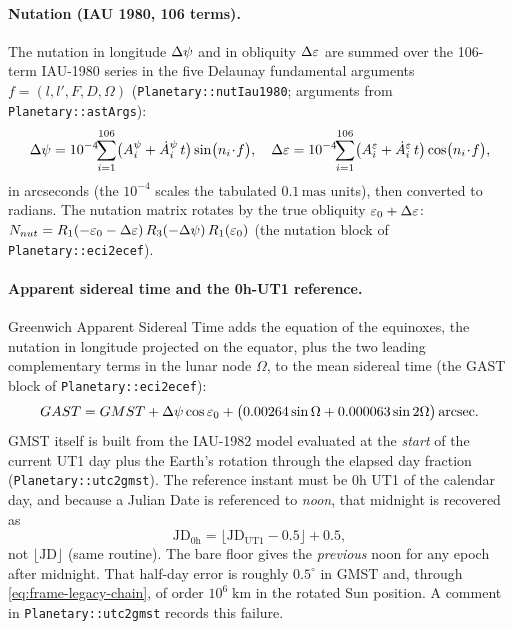 \documentclass[main.tex]{subfiles}
\begin{document}
\paragraph{Nutation (IAU 1980, 106 terms).}
The nutation in longitude $\Delta\psi$ and in obliquity $\Delta\varepsilon$ are summed
over the 106-term IAU-1980 series \cite{iers2010} in the five Delaunay
fundamental arguments $f = (l, l', F, D, \Omega)$
(\texttt{Planetary::nutIau1980}; arguments from
\texttt{Planetary::astArgs}):
\begin{equation}
\dpsi = 10^{-4}\!\!\sum_{i=1}^{106}\!\big(A^{\psi}_i + \dot A^{\psi}_i\,t\big)\sin\!\big(\bm{n}_i\!\cdot\! f\big),
\quad
\deps = 10^{-4}\!\!\sum_{i=1}^{106}\!\big(A^{\varepsilon}_i + \dot A^{\varepsilon}_i\,t\big)\cos\!\big(\bm{n}_i\!\cdot\! f\big),
\label{eq:frame-nutation}
\end{equation}
in arcseconds (the $10^{-4}$ scales the tabulated $0.1\,\mathrm{mas}$
units), then converted to radians.  The nutation matrix rotates by the
true obliquity $\varepsilon_0 + \Delta\varepsilon$:
$N_{nut} = R_{1}(-\varepsilon_0-\Delta\varepsilon)\,R_{3}(-\Delta\psi)\,R_{1}(\varepsilon_0)$
(the nutation block of \texttt{Planetary::eci2ecef}).

\paragraph{Apparent sidereal time and the 0h-UT1 reference.}
Greenwich Apparent Sidereal Time adds the equation of the equinoxes,
the nutation in longitude projected on the equator, plus the two leading
complementary terms in the lunar node $\Omega$, to the mean sidereal
time (the GAST block of \texttt{Planetary::eci2ecef}):
\begin{equation}
GAST = GMST + \Delta\psi\cos\varepsilon_0
        + \big(0.00264\sin\Omega + 0.000063\sin 2\Omega\big)\,\text{arcsec}.
\label{eq:frame-gast}
\end{equation}
GMST itself is built from the IAU-1982 model evaluated at the
\emph{start} of the current UT1 day plus the Earth's rotation through the
elapsed day fraction (\texttt{Planetary::utc2gmst}).  The reference
instant must be 0h UT1 of the calendar day, and because a Julian Date is
referenced to \emph{noon}, that midnight is recovered as
\begin{equation}
\mathrm{JD}_{0\mathrm h} = \big\lfloor \mathrm{JD}_{\mathrm{UT1}} - 0.5\big\rfloor + 0.5,
\label{eq:frame-0h-ut1}
\end{equation}
not $\lfloor\mathrm{JD}\rfloor$ (same routine).  The bare floor gives
the \emph{previous} noon for any epoch after midnight.  That half-day
error is roughly $0.5^{\circ}$ in GMST and, through
\eqref{eq:frame-legacy-chain}, of order $10^{6}\;\mathrm{km}$ in the
rotated Sun position.  A comment in \texttt{Planetary::utc2gmst} records
this failure.
\end{document}
